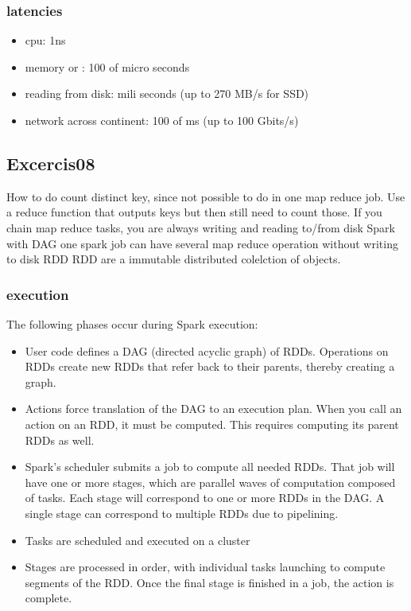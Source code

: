 \subsubsection{latencies}
\begin{itemize}
    \item cpu: 1ns
    \item memory or : 100 of micro seconds
    \item reading from disk: mili seconds (up to 270 MB/s for SSD)
    \item network across continent: 100 of ms (up to 100 Gbits/s)
\end{itemize}


\subsection{Excercis08}
How to do count distinct key, since not possible to do in one map reduce job.
Use a reduce function that outputs keys but then still need to count those.
If you chain map reduce tasks, you are always writing and reading to/from disk \textrightarrow Spark with DAG
one spark job can have several map reduce operation without writing to disk \textrightarrow RDD
RDD are a immutable distributed colelction of objects.


\subsubsection{execution}
The following phases occur during Spark execution:
\begin{itemize}
    \item User code defines a DAG (directed acyclic graph) of RDDs. Operations on RDDs create new RDDs that refer back to their parents, thereby creating a graph.
    \item Actions force translation of the DAG to an execution plan. When you call an action on an RDD, it must be computed. This requires computing its parent RDDs as well.
    \item Spark's scheduler submits a job to compute all needed RDDs. That job will have one or more stages, which are parallel waves of computation composed of tasks. Each stage will correspond to one or more RDDs in the DAG. A single stage can correspond to multiple RDDs due to pipelining.
    \item Tasks are scheduled and executed on a cluster
    \item Stages are processed in order, with individual tasks launching to compute segments of the RDD. Once the final stage is finished in a job, the action is complete.
\end{itemize}












